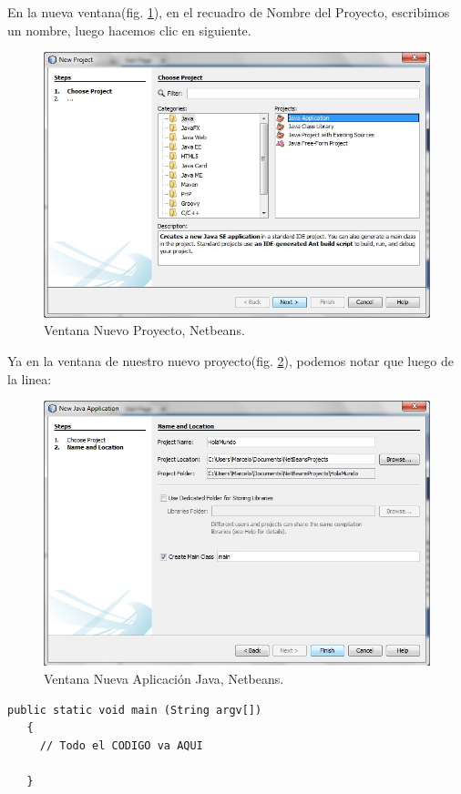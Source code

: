 \documentclass[12pt]{book} %
\begin{document}
En la nueva ventana(fig. \ref{hw02}), en el recuadro de Nombre del Proyecto, escribimos un nombre, luego hacemos clic en siguiente.

	\begin{figure}[h]
		\centering
			\includegraphics[width=12cm]{Hola_mundo_002.jpg}
			\caption{Ventana Nuevo Proyecto, Netbeans.}
			\label{hw02}
	\end{figure}

Ya en la ventana de nuestro nuevo proyecto(fig. \ref{hw03}), podemos notar que luego de la linea:

	\begin{figure}[h]
		\centering
			\includegraphics[width=12cm]{Hola_mundo_003.jpg}
			\caption{Ventana Nueva Aplicación Java, Netbeans.}
			\label{hw03}
	\end{figure}


\noindent
\begin{lstlisting}[frame=single]
   public static void main (String argv[])
   {
     // Todo el CODIGO va AQUI
     
   }
\end{lstlisting}
\end{document}
